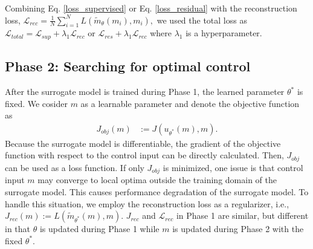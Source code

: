 \documentclass[letterpaper]{article}
\begin{document}
Combining Eq. \eqref{loss_supervised} or Eq. \eqref{loss_residual} with the reconstruction loss, $\mathcal{L}_{rec} = \frac{1}{N}\sum_{i=1}^N L(\tilde{m}_\theta(m_i), m_i ),$ we used the total loss as $\mathcal{L}_{total} = \mathcal{L}_{sup} + \lambda_1 \mathcal{L}_{rec}$ or $\mathcal{L}_{res} + \lambda_1 \mathcal{L}_{rec}$ where $\lambda_1$ is a hyperparameter.

\subsection*{Phase 2: Searching for optimal control} \label{section3_2}
After the surrogate model is trained during Phase 1, the learned parameter $\theta^*$ is fixed. We cosider $m$ as a learnable parameter and denote the objective function as
\begin{align}
  J_{obj}(m) &:= J(u_{\theta^*}(m), m).
\end{align}
Because the surrogate model is differentiable, the gradient of the objective function with respect to the control input can be directly calculated. Then, $J_{obj}$ can be used as a loss function. If only $J_{obj}$ is minimized, one issue is that control input $m$ may converge to local optima outside the training domain of the surrogate model. This causes performance degradation of the surrogate model. To handle this situation, we employ the reconstruction loss as a regularizer, i.e., $J_{rec}(m) := L(\tilde{m}_{\theta^*} (m), m)$. $J_{rec}$ and $\mathcal{L}_{rec}$ in Phase 1 are similar, but different in that $\theta$ is updated during Phase 1 while $m$ is updated during Phase 2 with the fixed $\theta^*$.
\end{document}
